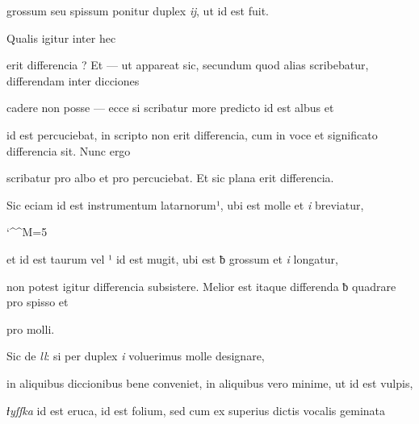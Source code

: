 \splitlines

grossum seu spissum ponitur duplex \textit{ĳ}, ut  id est fuit.

Qualis igitur inter hec

\fulllines
erit differencia ? Et — ut appareat sic, secundum quod alias scribebatur, differendam inter dicciones 

cadere non posse — ecce si scribatur more predicto  id est albus et 

id est percuciebat, in scripto non erit differencia, cum in voce et significato differencia sit. Nunc ergo

scribatur  pro albo et  pro percuciebat. Et sic plana erit differencia.

Sic eciam  id est instrumentum latarnorum¹, ubi est   molle et \textit{i} breviatur, 


\catcode `\^^M=5


\obeylines

et  id est taurum vel ¹ id est mugit, ubi est ƀ grossum et \textit{i} longatur,

non potest igitur differencia subsistere. Melior est itaque differenda ƀ quadrare pro spisso et 

\splitlines
{} pro molli.

\indentK Sic de \textit{ll}: si per duplex \textit{i} voluerimus  molle designare,

\fulllines
in aliquibus diccionibus bene conveniet, in aliquibus vero minime, ut  id est vulpis, 

\textit{ƚyſſka} id est eruca,  id est folium, sed cum ex superius dictis vocalis geminata

